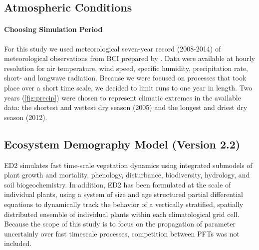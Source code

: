 \subsection*{Atmospheric Conditions}

\paragraph{Choosing Simulation Period}



For this study we used meteorological seven-year record (2008-2014) of meteorological observations from BCI prepared by \citep{powell_2019}. Data were available at hourly resolution for air temperature, wind speed, specific humidity, precipitation rate, short- and longwave radiation. Because we were focused on processes that took place over a short time scale, we decided to limit runs to one year in length. Two years (\ref{fig:precip}) were chosen to represent climatic extremes in the available data: the shortest and wettest dry season (2005) and the longest and driest dry season (2012). 
 
\subsection*{Ecosystem Demography Model (Version 2.2)}



ED2 simulates fast time-scale vegetation dynamics using integrated submodels of plant growth and mortality, phenology, disturbance, biodiversity, hydrology, and soil biogeochemistry. In addition, ED2 has been formulated at the scale of individual plants, using a system of size and age structured partial differential equations to dynamically track the behavior of a vertically stratified, spatially distributed ensemble  of individual plants within each climatological grid cell. Because the scope of this study is to focus on the propagation of parameter uncertainly over fast timescale processes, competition between PFTs was not included.






